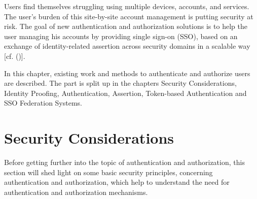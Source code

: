 Users find themselves struggling using multiple devices, accounts, and services. The user's burden of this site-by-site account management is putting security at risk. The goal of new authentication and authorization solutions is to help the user managing his accounts by providing single sign-on (SSO), based on an exchange of identity-related assertion across security domains in a scalable way [cf. (\cite{Corre:2017:WHI})].  

In this chapter, existing work and methods to authenticate and authorize users are described. The part is split up in the chapters Security Considerations, Identity Proofing, Authentication, Assertion, Token-based Authentication and SSO Federation Systems.


\section{Security Considerations}
\label{securityConsiderations}

Before getting further into the topic of authentication and authorization, this section will shed light on some basic security principles, concerning authentication and authorization, which help to understand the need for authentication and authorization mechanisms. 

